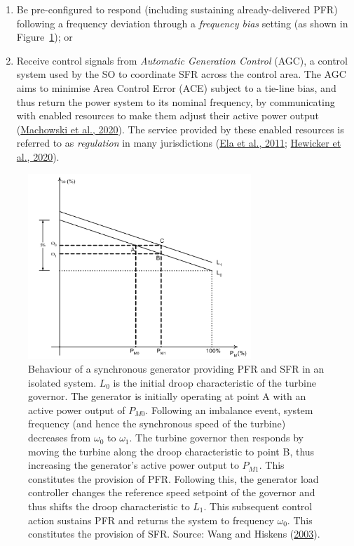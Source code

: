 \documentclass[12pt,a4paper,]{report}
\providecommand{\tightlist}{%
  \setlength{\itemsep}{0pt}\setlength{\parskip}{0pt}}
\begin{document}
\begin{enumerate}
\def\labelenumi{\arabic{enumi}.}
\tightlist
\item
  Be pre-configured to respond (including sustaining already-delivered
  PFR) following a frequency deviation through a \emph{frequency bias}
  setting (as shown in Figure~\ref{fig:droop}); or
\item
  Receive control signals from \emph{Automatic Generation Control}
  (AGC), a control system used by the SO to coordinate SFR across the
  control area. The AGC aims to minimise Area Control Error (ACE)
  subject to a tie-line bias, and thus return the power system to its
  nominal frequency, by communicating with enabled resources to make
  them adjust their active power output
  (\protect\hyperlink{ref-machowskiPowerSystemDynamics2020}{Machowski et
  al., 2020}). The service provided by these enabled resources is
  referred to as \emph{regulation} in many jurisdictions
  (\protect\hyperlink{ref-elaOperatingReservesVariable2011}{Ela et al.,
  2011};
  \protect\hyperlink{ref-hewickerDimensioningControlReserves2020}{Hewicker
  et al., 2020}).
\end{enumerate}

\begin{figure}
\hypertarget{fig:droop}{%
\centering
\includegraphics[width=0.75\textwidth,height=\textheight]{source/figures/droop.png}
\caption{Behaviour of a synchronous generator providing PFR and SFR in
an isolated system. \(L_0\) is the initial droop characteristic of the
turbine governor. The generator is initially operating at point A with
an active power output of \(P_{M0}\). Following an imbalance event,
system frequency (and hence the synchronous speed of the turbine)
decreases from \(\omega_0\) to \(\omega_1\). The turbine governor then
responds by moving the turbine along the droop characteristic to point
B, thus increasing the generator's active power output to \(P_{M1}\).
This constitutes the provision of PFR. Following this, the generator
load controller changes the reference speed setpoint of the governor and
thus shifts the droop characteristic to \(L_1\). This subsequent control
action sustains PFR and returns the system to frequency \(\omega_0\).
This constitutes the provision of SFR. Source: Wang and Hiskens
(\protect\hyperlink{ref-wangReviewAGCImplementation2003}{2003}).}\label{fig:droop}
}
\end{figure}
\end{document}
